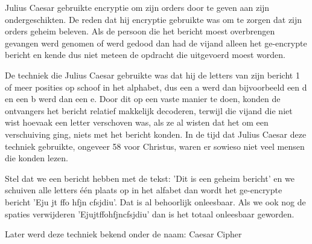 Julius Caesar gebruikte encryptie om zijn orders door te geven aan zijn ondergeschikten. De reden dat hij encryptie gebruikte was om te zorgen dat zijn orders geheim beleven. Als de persoon die het bericht moest overbrengen gevangen werd genomen of werd gedood dan had de vijand alleen het ge-encrypte bericht en kende dus niet meteen de opdracht die uitgevoerd moest worden.

De techniek die Julius Caesar gebruikte was dat hij de letters van zijn bericht 1 of meer posities op schoof in het alphabet, dus een a werd dan bijvoorbeeld een d en een b werd dan een e. Door dit op een vaste manier te doen, konden de ontvangers het bericht relatief makkelijk decoderen, terwijl die vijand die niet wist hoevaak een letter verschoven was, als ze al wisten dat het om een verschuiving ging, niets met het bericht konden. In de tijd dat Julius Caesar deze techniek gebruikte, ongeveer 58 voor Christus, waren er sowieso niet veel mensen die konden lezen.

Stel dat we een bericht hebben met de tekst: 'Dit is een geheim bericht' en we schuiven alle letters één plaats op in het alfabet dan wordt het ge-encrypte bericht 'Eju jt ffo hfjn cfsjdiu'. Dat is al behoorlijk onleesbaar. Als we ook nog de spaties verwijderen 'Ejujtffohfjncfsjdiu' dan is het totaal onleesbaar geworden.

Later werd deze techniek bekend onder de naam: Caesar Cipher


